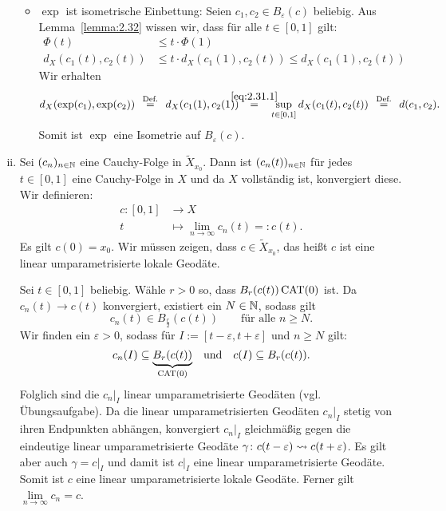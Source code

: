 \begin{beweis}
\begin{enumerate}[(i)]
\begin{itemize}
			
			\item $\exp$ ist isometrische Einbettung:
			Seien $c_1,c_2 \in B_\varepsilon(c)$ beliebig.
			Aus Lemma~\ref{lemma:2.32} wissen wir, dass für alle $t \in [0,1]$ gilt:
			\begin{align}
				\Phi(t) &\leq t \cdot \Phi(1) \\
				d_X(c_1(t),c_2(t)) &\leq t \cdot d_X(c_1(1),c_2(t)) \leq d_X(c_1(1),c_2(t)) \label{eq:2.31.1}
			\end{align}
			Wir erhalten
			\[
				d_X(\exp(c_1),\exp(c_2)) \stack{\text{Def.}}{=} d_X(c_1(1),c_2(1))  \stack{\eqref{eq:2.31.1}}{=} \sup_{t \in [0,1]} d_X(c_1(t),c_2(t)) \stack{\text{Def.}}{=} d(c_1,c_2).
			\]
			Somit ist $\exp$ eine Isometrie auf $B_\varepsilon(c)$.
		\end{itemize}
		\item Sei $(c_n)_{n \in \mathbb{N}}$ eine Cauchy-Folge in $\tilde{X}_{x_0}$.
		Dann ist $(c_n(t))_{n \in \mathbb{N}}$ für jedes $t \in [0,1]$ eine Cauchy-Folge in $X$ und da $X$ vollständig ist, konvergiert diese.
		Wir definieren:
		\begin{align*}
			c \colon [0,1] &\longrightarrow X \\
			t &\longmapsto \lim\limits_{n \rightarrow \infty} c_n(t) =: c(t).
		\end{align*}
		Es gilt $c(0) = x_0$.
		Wir müssen zeigen, dass $c \in \tilde{X}_{x_0}$, das heißt $c$ ist eine linear umparametrisierte lokale Geodäte.
		
		Sei $t \in [0,1]$ beliebig.
		Wähle  $r > 0$ so, dass $B_r(c(t)) \operatorname{CAT(0)}$ ist.
		Da $c_n(t) \rightarrow c(t)$ konvergiert, existiert ein $N \in \mathbb{N}$, sodass gilt
		\[
			c_n(t) \in B_{\frac{r}{2}}(c(t)) \qquad \text{für alle } n \geq N.
		\]
		Wir finden ein $\varepsilon > 0$, sodass für $I := [t- \varepsilon, t+ \varepsilon]$ und $n \geq N$ gilt:
		\[
			c_n(I) \subseteq {\underbrace{B_r(c(t))}_{\operatorname{CAT(0)}}} \quad \text{und} \quad c(I) \subseteq B_r(c(t)).
		\]
		Folglich sind die $c_n \big|_I$ linear umparametrisierte Geodäten (vgl. Übungsaufgabe).
		Da die linear umparametrisierten Geodäten $c_n \big|_I$ stetig von ihren Endpunkten abhängen, konvergiert $c_n \big|_I$ gleichmäßig gegen die eindeutige linear umparametrisierte Geodäte $\gamma \colon c(t-\varepsilon) \rightsquigarrow c(t+\varepsilon)$.
		Es gilt aber auch $\gamma = c \big|_I$ und damit ist $c \big|_I$ eine linear umparametrisierte Geodäte. Somit ist $c$ eine linear umparametrisierte lokale Geodäte.
		Ferner gilt $\lim\limits_{n \rightarrow \infty} c_n = c$. 
	\end{enumerate}
\end{beweis}	

